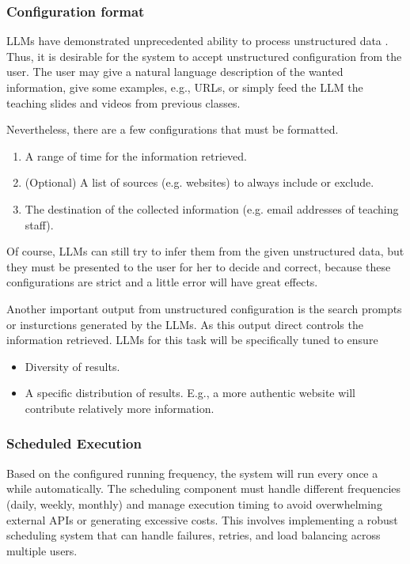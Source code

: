 \documentclass[project-plan]{report-template}
\begin{document}
\subsubsection{Configuration format} 
LLMs have demonstrated unprecedented ability to process unstructured data
\cite{llm.unstructured.data.1, llm.unstructured.data.2}. Thus, it is desirable
for the system to accept unstructured configuration from the user. The user may
give a natural language description of the wanted information, give some
examples, e.g., URLs, or simply feed the LLM the teaching slides and videos
from previous classes.

Nevertheless, there are a few configurations that must be formatted.
\begin{enumerate}
	\item A range of time for the information retrieved.
	\item (Optional) A list of sources (e.g. websites) to always include or exclude.
	\item The destination of the collected information (e.g. email addresses of
		teaching staff).
\end{enumerate}
Of course, LLMs can still try to infer them from the given unstructured data,
but they must be presented to the user for her to decide and correct, because
these configurations are strict and a little error will have great effects.

Another important output from unstructured configuration is the search prompts
or insturctions generated by the LLMs. As this output direct controls the
information retrieved. LLMs for this task will be specifically tuned to ensure
\begin{itemize}
	\item Diversity of results.
	\item A specific distribution of results. E.g., a more authentic website
		will contribute relatively more information.
\end{itemize}

\subsubsection{Scheduled Execution} Based on the configured running frequency,
the system will run every once a while automatically. The scheduling component
must handle different frequencies (daily, weekly, monthly) and manage execution
timing to avoid overwhelming external APIs or generating excessive costs. This
involves implementing a robust scheduling system that can handle failures,
retries, and load balancing across multiple users.
\end{document}
